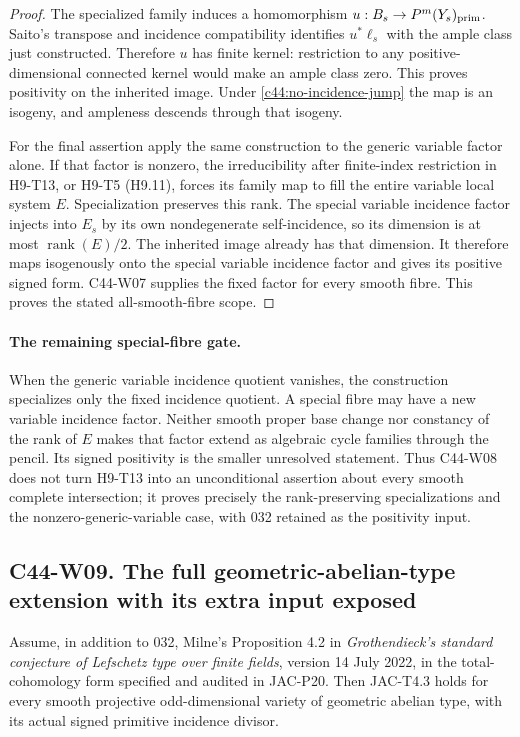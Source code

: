 \begin{proof}
The specialized family induces a homomorphism
$u:B_s\to P^m(Y_s)_{\rm prim}$. Saito's transpose and incidence
compatibility identifies $u^*\ell_s$ with the ample class just
constructed. Therefore $u$ has finite kernel: restriction to any
positive-dimensional connected kernel would make an ample class
zero. This proves positivity on the inherited image. Under
\eqref{c44:no-incidence-jump} the map is an isogeny, and ampleness
descends through that isogeny.

For the final assertion apply the same construction to the generic
variable factor alone. If that factor is nonzero, the irreducibility
after finite-index restriction in H9-T13, or H9-T5 (H9.11), forces
its family map to fill the entire variable local system $E$.
Specialization preserves this rank. The special variable incidence
factor injects into $E_s$ by its own nondegenerate self-incidence,
so its dimension is at most $\operatorname{rank}(E)/2$. The
inherited image already has that dimension. It therefore maps
isogenously onto the special variable incidence factor and gives
its positive signed form. C44-W07 supplies the fixed factor for
every smooth fibre. This proves the stated all-smooth-fibre scope.
\end{proof}

\paragraph{The remaining special-fibre gate.}
When the generic variable incidence quotient vanishes, the
construction specializes only the fixed incidence quotient. A
special fibre may have a new variable incidence factor. Neither
smooth proper base change nor constancy of the rank of $E$ makes
that factor extend as algebraic cycle families through the pencil.
Its signed positivity is the smaller unresolved statement. Thus
C44-W08 does not turn H9-T13 into an unconditional assertion about
every smooth complete intersection; it proves precisely the
rank-preserving specializations and the nonzero-generic-variable
case, with 032 retained as the positivity input.

\subsection*{C44-W09. The full geometric-abelian-type extension with its extra input exposed}

\begin{proposition}
Assume, in addition to 032, Milne's Proposition 4.2 in
\emph{Grothendieck's standard conjecture of Lefschetz type over
finite fields}, version 14 July 2022, in the total-cohomology form
specified and audited in JAC-P20. Then JAC-T4.3 holds for every
smooth projective odd-dimensional variety of geometric abelian
type, with its actual signed primitive incidence divisor.
\end{proposition}

